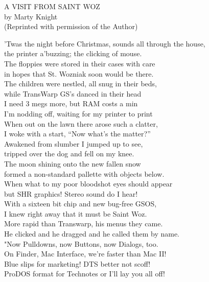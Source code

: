 \documentclass{report}
\newenvironment{usenet}{\raggedright\small\ttfamily}{\rmfamily}
\begin{document}
    \begin{usenet}
        A VISIT FROM SAINT WOZ\\
        by Marty Knight\\
        (Reprinted with permission of the Author)

        'Twas the night before Christmas, sounds all through the house,\\
        the printer a'buzzing; the clicking of mouse.\\
        The floppies were stored in their cases with care\\
        in hopes that St. Wozniak soon would be there.\\
        The children were nestled, all snug in their beds,\\
        while TransWarp GS's danced in their head\\
        I need 3 megs more, but RAM costs a min\\
        I'm nodding off, waiting for my printer to print\\
        When out on the lawn there arose such a clatter,\\
        I woke with a start, ``Now what's the matter?''\\
        Awakened from slumber I jumped up to see,\\
        tripped over the dog and fell on my knee.\\
        The moon shining onto the new fallen snow\\
        formed a non-standard pallette with objects below.\\
        When what to my poor bloodshot eyes should appear\\
        but SHR graphics! Stereo sound do I hear!\\
        With a sixteen bit chip and new bug-free GSOS,\\
        I knew right away that it must be Saint Woz.\\
        More rapid than Transwarp, his menus they came.\\
        He clicked and he dragged and he called them by name.\\
        "Now Pulldowns, now Buttons, now Dialogs, too.\\
        On Finder, Mac Interface, we're faster than Mac II!\\
        Blue slips for marketing! DTS better not scoff!\\
        ProDOS format for Technotes or I'll lay you all off!\\

\end{usenet}
\end{document}
